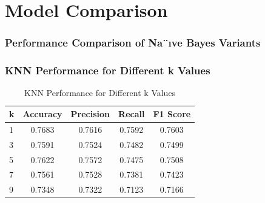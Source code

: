 \documentclass[12pt]{article}
\begin{document}
\section{Model Comparison}
\subsubsection*{Performance Comparison of Na¨ıve Bayes Variants}
\begin{table}[h!]
\centering
\caption{Performance Comparison of Na¨ıve Bayes Variants}
\label{tab:nb_variants}
\end{table}

\subsubsection*{KNN Performance for Different k Values}
\begin{table}[H]
\centering
\caption{KNN Performance for Different k Values}
\label{tab:knn_k_values}
\begin{tabular}{@{}lcccc@{}}
\toprule
\textbf{k} & \textbf{Accuracy} & \textbf{Precision} & \textbf{Recall} & \textbf{F1 Score} \\
\midrule
1 & 0.7683 & 0.7616 & 0.7592 & 0.7603 \\
3 & 0.7591 & 0.7524 & 0.7482 & 0.7499 \\
5 & 0.7622 & 0.7572 & 0.7475 & 0.7508 \\
7 & 0.7561 & 0.7528 & 0.7381 & 0.7423 \\
9 & 0.7348 & 0.7322 & 0.7123 & 0.7166 \\
\bottomrule
\end{tabular}
\end{table}
\end{document}
